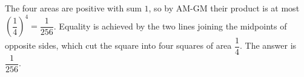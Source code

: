 The four areas are positive with sum $1$, so by AM-GM their product is at most $\left(\dfrac{1}{4}\right)^4=\dfrac{1}{256}$. Equality is achieved by the two lines joining the midpoints of opposite sides, which cut the square into four squares of area $\dfrac{1}{4}$. The answer is $\boxed{\dfrac{1}{256}}$.
